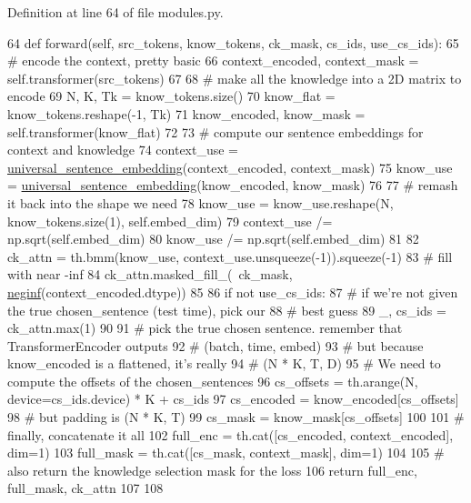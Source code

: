 Definition at line 64 of file modules.\+py.


\begin{DoxyCode}
64     \textcolor{keyword}{def }forward(self, src\_tokens, know\_tokens, ck\_mask, cs\_ids, use\_cs\_ids):
65         \textcolor{comment}{# encode the context, pretty basic}
66         context\_encoded, context\_mask = self.transformer(src\_tokens)
67 
68         \textcolor{comment}{# make all the knowledge into a 2D matrix to encode}
69         N, K, Tk = know\_tokens.size()
70         know\_flat = know\_tokens.reshape(-1, Tk)
71         know\_encoded, know\_mask = self.transformer(know\_flat)
72 
73         \textcolor{comment}{# compute our sentence embeddings for context and knowledge}
74         context\_use = \hyperlink{namespaceprojects_1_1wizard__of__wikipedia_1_1generator_1_1modules_aa0e28a2592caa75f5c687c6200d2a68d}{universal\_sentence\_embedding}(context\_encoded, 
      context\_mask)
75         know\_use = \hyperlink{namespaceprojects_1_1wizard__of__wikipedia_1_1generator_1_1modules_aa0e28a2592caa75f5c687c6200d2a68d}{universal\_sentence\_embedding}(know\_encoded, know\_mask)
76 
77         \textcolor{comment}{# remash it back into the shape we need}
78         know\_use = know\_use.reshape(N, know\_tokens.size(1), self.embed\_dim)
79         context\_use /= np.sqrt(self.embed\_dim)
80         know\_use /= np.sqrt(self.embed\_dim)
81 
82         ck\_attn = th.bmm(know\_use, context\_use.unsqueeze(-1)).squeeze(-1)
83         \textcolor{comment}{# fill with near -inf}
84         ck\_attn.masked\_fill\_(~ck\_mask, \hyperlink{namespaceparlai_1_1utils_1_1misc_a68c44ca571de7149b683539db659c330}{neginf}(context\_encoded.dtype))
85 
86         \textcolor{keywordflow}{if} \textcolor{keywordflow}{not} use\_cs\_ids:
87             \textcolor{comment}{# if we're not given the true chosen\_sentence (test time), pick our}
88             \textcolor{comment}{# best guess}
89             \_, cs\_ids = ck\_attn.max(1)
90 
91         \textcolor{comment}{# pick the true chosen sentence. remember that TransformerEncoder outputs}
92         \textcolor{comment}{#   (batch, time, embed)}
93         \textcolor{comment}{# but because know\_encoded is a flattened, it's really}
94         \textcolor{comment}{#   (N * K, T, D)}
95         \textcolor{comment}{# We need to compute the offsets of the chosen\_sentences}
96         cs\_offsets = th.arange(N, device=cs\_ids.device) * K + cs\_ids
97         cs\_encoded = know\_encoded[cs\_offsets]
98         \textcolor{comment}{# but padding is (N * K, T)}
99         cs\_mask = know\_mask[cs\_offsets]
100 
101         \textcolor{comment}{# finally, concatenate it all}
102         full\_enc = th.cat([cs\_encoded, context\_encoded], dim=1)
103         full\_mask = th.cat([cs\_mask, context\_mask], dim=1)
104 
105         \textcolor{comment}{# also return the knowledge selection mask for the loss}
106         \textcolor{keywordflow}{return} full\_enc, full\_mask, ck\_attn
107 
108 
\end{DoxyCode}


